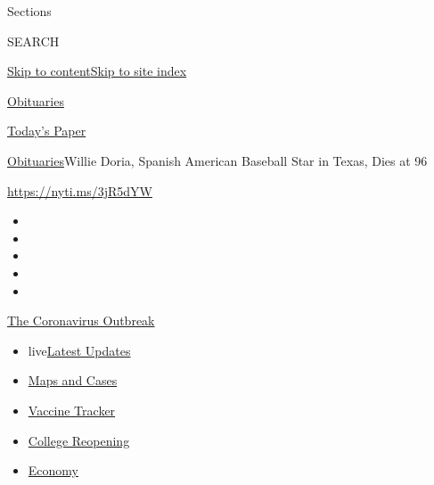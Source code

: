 Sections

SEARCH

\protect\hyperlink{site-content}{Skip to
content}\protect\hyperlink{site-index}{Skip to site index}

\href{https://www.nytimes.com/section/obituaries}{Obituaries}

\href{https://myaccount.nytimes.com/auth/login?response_type=cookie\&client_id=vi}{}

\href{https://www.nytimes.com/section/todayspaper}{Today's Paper}

\href{/section/obituaries}{Obituaries}\textbar{}Willie Doria, Spanish
American Baseball Star in Texas, Dies at 96

\url{https://nyti.ms/3jR5dYW}

\begin{itemize}
\item
\item
\item
\item
\item
\end{itemize}

\href{https://www.nytimes.com/news-event/coronavirus?action=click\&pgtype=Article\&state=default\&region=TOP_BANNER\&context=storylines_menu}{The
Coronavirus Outbreak}

\begin{itemize}
\tightlist
\item
  live\href{https://www.nytimes.com/2020/08/03/world/coronavirus-covid-19.html?action=click\&pgtype=Article\&state=default\&region=TOP_BANNER\&context=storylines_menu}{Latest
  Updates}
\item
  \href{https://www.nytimes.com/interactive/2020/us/coronavirus-us-cases.html?action=click\&pgtype=Article\&state=default\&region=TOP_BANNER\&context=storylines_menu}{Maps
  and Cases}
\item
  \href{https://www.nytimes.com/interactive/2020/science/coronavirus-vaccine-tracker.html?action=click\&pgtype=Article\&state=default\&region=TOP_BANNER\&context=storylines_menu}{Vaccine
  Tracker}
\item
  \href{https://www.nytimes.com/2020/08/02/us/covid-college-reopening.html?action=click\&pgtype=Article\&state=default\&region=TOP_BANNER\&context=storylines_menu}{College
  Reopening}
\item
  \href{https://www.nytimes.com/live/2020/08/03/business/stock-market-today-coronavirus?action=click\&pgtype=Article\&state=default\&region=TOP_BANNER\&context=storylines_menu}{Economy}
\end{itemize}

